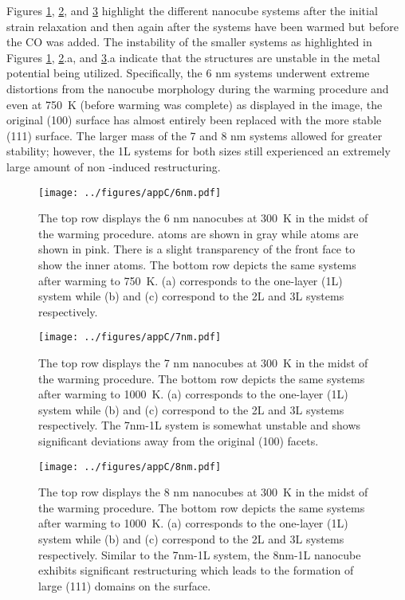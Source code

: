 Figures \ref{fig:6nm}, \ref{fig:7nm}, and \ref{fig:8nm} highlight the different
nanocube systems after the initial strain relaxation and then again after the systems
have been warmed but before the CO was added. The instability of the smaller
systems as highlighted in Figures \ref{fig:6nm}, \ref{fig:7nm}.a, and
\ref{fig:8nm}.a indicate that the structures are unstable in the metal
potential being utilized. Specifically, the 6 nm systems underwent extreme
distortions from the nanocube morphology during the warming procedure and even
at 750~K (before warming was complete) as displayed in the image, the original
(100) surface has almost entirely been replaced with the more stable (111)
surface. The larger mass of the 7 and 8 nm systems allowed for greater
stability; however, the 1L systems for both sizes still experienced an
extremely large amount of non -induced restructuring.

\begin{landscape}
\begin{figure}[p!]
\centering
  \texttt{[image: ../figures/appC/6nm.pdf]}
  \caption{The top row displays the 6 nm nanocubes at 300~K in the midst of the
warming procedure.   atoms are shown in gray while  atoms are
shown in pink.  There is a slight transparency of the front  face to
show the inner  atoms. The bottom row depicts the same systems after
warming to 750~K.  (a) corresponds to the one-layer (1L) system while (b) and
(c) correspond to the 2L and 3L systems respectively.}
  \label{fig:6nm}
\end{figure}
\end{landscape}

\begin{landscape}
\begin{figure}[p!]
\centering
  \texttt{[image: ../figures/appC/7nm.pdf]}
  \caption{The top row displays the 7 nm nanocubes at 300~K in the midst of the warming procedure.
The bottom row depicts the same systems after warming to
1000~K.  (a) corresponds to the one-layer (1L) system while (b) and (c)
correspond to the 2L and 3L systems respectively. The 7nm-1L system is somewhat
unstable and shows significant deviations away from the original (100) facets.}
  \label{fig:7nm}
\end{figure}
\end{landscape}

\begin{landscape}
\begin{figure}[p!]
\centering
  \texttt{[image: ../figures/appC/8nm.pdf]}
  \caption{The top row displays the 8 nm nanocubes at 300~K in the midst of the
warming procedure.  The bottom row depicts the same systems after warming to
1000~K.  (a) corresponds to the one-layer (1L) system while (b) and (c)
correspond to the 2L and 3L systems respectively. Similar to the 7nm-1L system,
the 8nm-1L nanocube exhibits significant restructuring which leads to the 
formation of large (111) domains on the surface.}
  \label{fig:8nm}
\end{figure}
\end{landscape}



